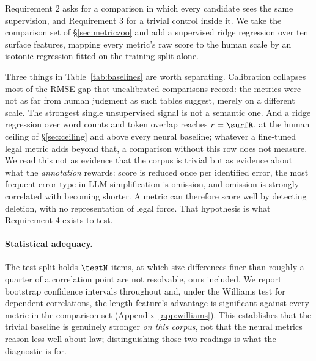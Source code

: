 \documentclass[11pt]{article}
\begin{document}
Requirement 2 asks for a comparison in which every candidate sees the same
supervision, and Requirement 3 for a trivial control inside it. We take the
comparison set of \S\ref{sec:metriczoo} and add a supervised ridge regression
over ten surface features, mapping every metric's raw score to the human scale
by an isotonic regression fitted on the training split alone.

\begin{table}[t]\centering\small

\caption{Calibrated comparison on the \textsc{FrJudge} test split, mean over
10 seeds. RMSE$_{\text{raw}}$ is the decimal-scaling protocol in current use;
RMSE$_{\text{cal}}$ fits an isotonic map on the training split. $r$ and $\rho$
are unaffected by calibration for the unsupervised metrics.}
\label{tab:baselines}
\end{table}

Three things in Table~\ref{tab:baselines} are worth separating. Calibration
collapses most of the RMSE gap that uncalibrated comparisons record: the metrics
were not as far from human judgment as such tables suggest, merely on a
different scale. The strongest single unsupervised signal is not a semantic one.
And a ridge regression over word counts and token overlap reaches $r=\surfR$,
at the human ceiling of \S\ref{sec:ceiling} and above every neural baseline;
whatever a fine-tuned legal metric adds beyond that, a comparison without this
row does not measure. We read this not as evidence that the corpus is trivial
but as evidence about what the \emph{annotation} rewards: score is reduced once
per identified error, the most frequent error type in LLM simplification is
omission, and omission is strongly correlated with becoming shorter. A metric
can therefore score well by detecting deletion, with no representation of legal
force. That hypothesis is what Requirement 4 exists to test.

\paragraph{Statistical adequacy.}
The test split holds $\testN$ items, at which size differences finer than
roughly a quarter of a correlation point are not resolvable, ours included. We
report bootstrap confidence intervals throughout
\citep{deutsch2021statistical} and, under the Williams test for dependent
correlations, the length feature's advantage is significant against every metric
in the comparison set (Appendix~\ref{app:williams}). This establishes that the
trivial baseline is genuinely stronger \emph{on this corpus}, not that the
neural metrics reason less well about law; distinguishing those two readings is
what the diagnostic is for.
\end{document}

